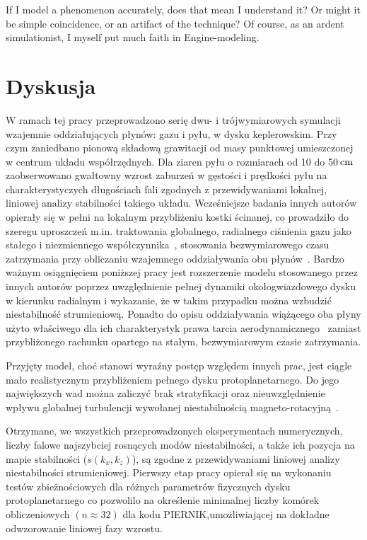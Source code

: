 \begin{savequote}[75mm]
   If I model a phenomenon accurately, does that mean I understand it? Or might
   it be simple coincidence, or an artifact of the technique? Of course, as an
   ardent simulationist, I myself put much faith in Engine-modeling.
\end{savequote}

\chapter{Dyskusja}
W ramach tej pracy przeprowadzono serię dwu- i trójwymiarowych symulacji
wzajemnie oddziałujących płynów: gazu i pyłu, w dysku keplerowskim. Przy czym
zaniedbano pionową składową grawitacji od masy punktowej umieszczonej w centrum
układu współrzędnych. Dla ziaren pyłu o rozmiarach od 10 do 50$\hbox{$\thinspace\textrm{cm}$}$
zaobserwowano gwałtowny wzrost zaburzeń w gęstości i prędkości pyłu na
charakterystyczych długościach fali zgodnych z przewidywaniami lokalnej,
liniowej analizy stabilności takiego układu. Wcześniejsze badania innych
autorów~\cite{YG05, JY07, TB09, BS10a, BS10b} opierały się w pełni na lokalnym
przybliżeniu kostki ścinanej, co prowadziło do szeregu uproszczeń m.in.
traktowania globalnego, radialnego ciśnienia gazu jako stałego i niezmiennego
współczynnika~\cite{N86}, stosowania bezwymiarowego czasu zatrzymania przy
obliczaniu wzajemnego oddziaływania obu płynów~\cite{YG05}. Bardzo ważnym
osiągnięciem poniższej pracy jest rozszerzenie modelu stosowanego przez innych
autorów poprzez uwzględnienie pełnej dynamiki okołogwiazdowego dysku w kierunku
radialnym i wykazanie, że w takim przypadku można wzbudzić niestabilność
strumieniową. Ponadto do opisu oddziaływania wiążącego oba płyny użyto
właściwego dla ich charakterystyk prawa tarcia aerodynamicznego~
zamiast przybliżonego rachunku opartego na stałym, bezwymiarowym czasie
zatrzymania.

\par Przyjęty model, choć stanowi wyraźny postęp względem innych prac, jest
ciągle mało realistycznym przybliżeniem pełnego dysku protoplanetarnego. Do jego
największych wad można zaliczyć brak stratyfikacji oraz nieuwzględnienie wpływu
globalnej turbulencji wywołanej niestabilnością magneto-rotacyjną~\cite{DKJ14}. 


\par Otrzymane, we wszystkich przeprowadzonych eksperymentach numerycznych,
liczby falowe najszybciej rosnących modów niestabilności, a także ich pozycja na
mapie stabilności ($s(k_x, k_z)$), są zgodne z przewidywaniami liniowej analizy
niestabilności strumieniowej. Pierwszy etap pracy opierał się na wykonaniu
testów zbieżnościowych dla różnych parametrów fizycznych dysku protoplanetarnego
co pozwolilo na określenie minimalnej liczby komórek obliczeniowych
$(n\approx32)$ dla kodu \textsc{PIERNIK},umożliwiającej na dokładne odwzorowanie
liniowej fazy wzrostu. 

